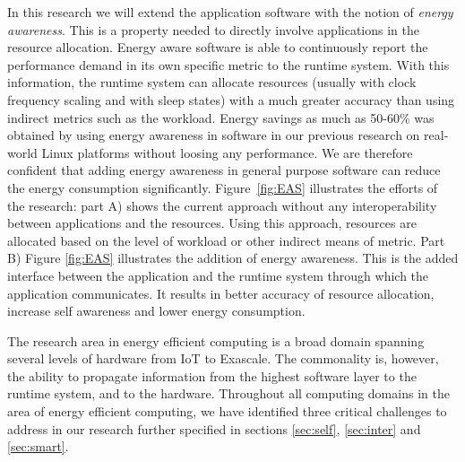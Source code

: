\documentclass{article}
\begin{document}
In this research we will extend the application software with the notion of \textit{energy awareness}.
This is a property needed to directly involve applications in the resource allocation.
Energy aware software is able to continuously report the performance demand in its own specific metric to the runtime system.
With this information, the runtime system can allocate resources (usually with clock frequency scaling and with sleep states) with a much greater accuracy than using indirect metrics such as the workload.
Energy savings as much as 50-60\% was obtained by using energy awareness in software in our previous research \cite{Holmbacka:15} on real-world Linux platforms without loosing any performance.
We are therefore confident that adding energy awareness in general purpose software can reduce the energy consumption significantly.
Figure~\ref{fig:EAS} illustrates the efforts of the research: part A) shows the current approach without any interoperability between applications and the resources.
Using this approach, resources are allocated based on the level of workload or other indirect means of metric.
Part B) Figure \ref{fig:EAS} illustrates the addition of energy awareness. 
This is the added interface between the application and the runtime system through which the application communicates.
It results in better accuracy of resource allocation, increase self awareness and lower energy consumption.\smallskip

The research area in energy efficient computing is a broad domain spanning several levels of hardware from IoT to Exascale.
The commonality is, however, the ability to propagate information from the highest software layer to the runtime system, and to the hardware.
Throughout all computing domains in the area of energy efficient computing, we have identified three critical challenges to address in our research further specified in sections \ref{sec:self}, \ref{sec:inter} and \ref{sec:smart}.
\end{document}
